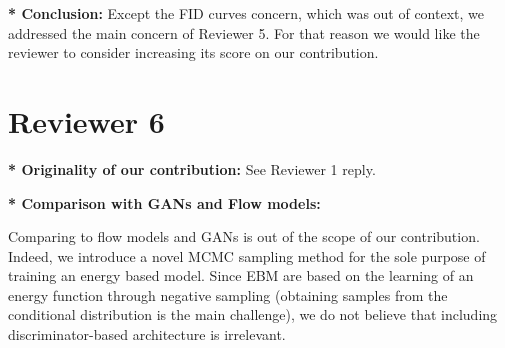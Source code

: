 \documentclass[letterpaper]{article} %
\begin{document}
\noindent \textbf{* Conclusion:} Except the FID curves concern, which was out of context, we addressed the main concern of Reviewer 5. For that reason we would like the reviewer to consider increasing its score on our contribution.

\vspace{-0.1in}
\section{Reviewer 6}


\noindent \textbf{* Originality of our contribution:} 
See Reviewer 1 reply.

\noindent \textbf{* Comparison with GANs and Flow models:} 

Comparing to flow models and GANs is out of the scope of our contribution.
Indeed, we introduce a novel MCMC sampling method for the sole purpose of training an energy based model.
Since EBM are based on the learning of an energy function through negative sampling (obtaining samples from the conditional distribution is the main challenge), we do not believe that including discriminator-based architecture is irrelevant. 


%
%
%
%
%
%
\end{document}
